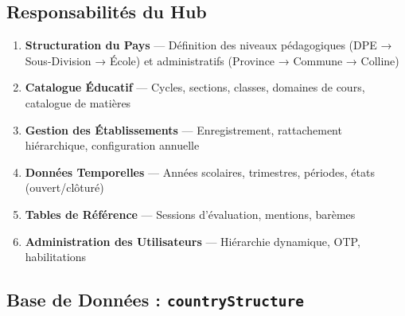 \documentclass[12pt,a4paper,oneside]{report}
\begin{document}
\subsection{Responsabilités du Hub}

\begin{enumerate}
  \item \textbf{Structuration du Pays} — Définition des niveaux pédagogiques (DPE → Sous-Division → École) et administratifs (Province → Commune → Colline)
  \item \textbf{Catalogue Éducatif} — Cycles, sections, classes, domaines de cours, catalogue de matières
  \item \textbf{Gestion des Établissements} — Enregistrement, rattachement hiérarchique, configuration annuelle
  \item \textbf{Données Temporelles} — Années scolaires, trimestres, périodes, états (ouvert/clôturé)
  \item \textbf{Tables de Référence} — Sessions d'évaluation, mentions, barèmes
  \item \textbf{Administration des Utilisateurs} — Hiérarchie dynamique, OTP, habilitations
\end{enumerate}

\subsection{Base de Données : \texttt{countryStructure}}
\end{document}
